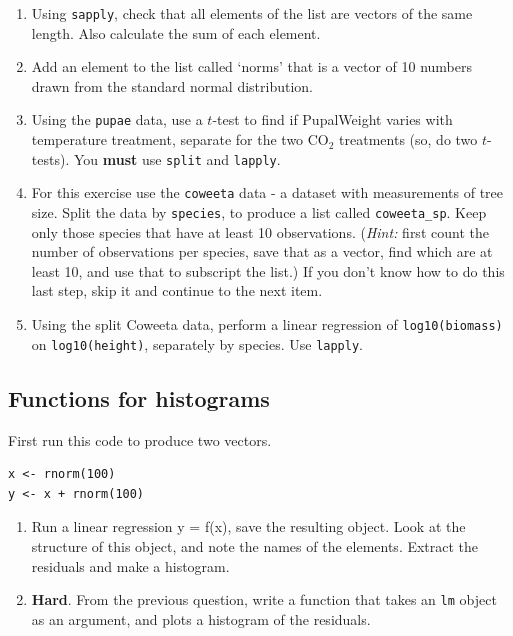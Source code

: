 \documentclass[]{book}
\begin{document}
\begin{enumerate}
\def\labelenumi{\arabic{enumi}.}
\item
  Using \texttt{sapply}, check that all elements of the list are vectors of the same length. Also calculate the sum of each element.
\item
  Add an element to the list called `norms' that is a vector of 10 numbers drawn from the standard normal distribution.
\item
  Using the \texttt{pupae} data, use a \(t\)-test to find if PupalWeight varies with temperature treatment, separate for the two CO\(_2\) treatments (so, do two \(t\)-tests). You \textbf{must} use \texttt{split} and \texttt{lapply}.
\item
  For this exercise use the \texttt{coweeta} data - a dataset with measurements of tree size. Split the data by \texttt{species}, to produce a list called \texttt{coweeta\_sp}. Keep only those species that have at least 10 observations. (\emph{Hint:} first count the number of observations per species, save that as a vector, find which are at least 10, and use that to subscript the list.) If you don't know how to do this last step, skip it and continue to the next item.
\item
  Using the split Coweeta data, perform a linear regression of \texttt{log10(biomass)} on \texttt{log10(height)}, separately by species. Use \texttt{lapply}.
\end{enumerate}

\hypertarget{functions-for-histograms}{%
\subsection{Functions for histograms}\label{functions-for-histograms}}

First run this code to produce two vectors.

\begin{verbatim}
x <- rnorm(100)
y <- x + rnorm(100)
\end{verbatim}

\begin{enumerate}
\def\labelenumi{\arabic{enumi}.}
\item
  Run a linear regression y = f(x), save the resulting object. Look at the structure of this object, and note the names of the elements. Extract the residuals and make a histogram.
\item
  \textbf{Hard}. From the previous question, write a function that takes an \texttt{lm} object as an argument, and plots a histogram of the residuals.
\end{enumerate}
\end{document}
